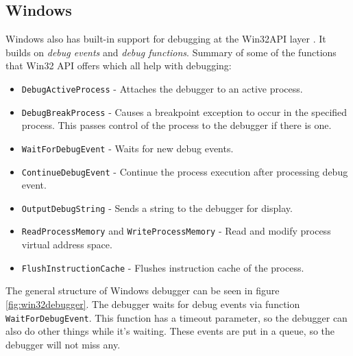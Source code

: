 \subsection{Windows}
Windows also has built-in support for debugging at the Win32API layer
\cite{windows-msdn-debugging-api, windows-press-debugging-api}.
It builds on \textit{debug events} and \textit{debug functions}. Summary of
some of the functions that Win32 API offers which all help with debugging:

\begin{itemize}
    \item \texttt{DebugActiveProcess} - Attaches the debugger to an active process.
    \item \texttt{DebugBreakProcess} - Causes a breakpoint exception to occur in the specified process.
                                          This passes control of the process to the debugger if there is one.
    \item \texttt{WaitForDebugEvent} - Waits for new debug events.
    \item \texttt{ContinueDebugEvent} - Continue the process execution after processing debug event.
    \item \texttt{OutputDebugString} - Sends a string to the debugger for display.
    \item \texttt{ReadProcessMemory} and \texttt{WriteProcessMemory} - Read and modify
          process virtual address space.
    \item \texttt{FlushInstructionCache} - Flushes instruction cache of the process.
\end{itemize}

The general structure of Windows debugger can be seen in figure \ref{fig:win32debugger}.
The debugger waits for debug events via function \texttt{WaitForDebugEvent}.
This function has a timeout parameter, so the debugger can also do other things while it's waiting.
These events are put in a queue, so the debugger will not miss any.


